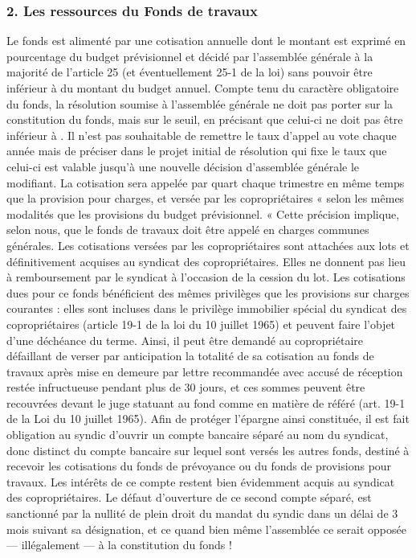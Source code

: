 		\subsubsection{2. Les ressources du Fonds de travaux}
		
			Le fonds est alimenté par une cotisation annuelle dont le montant est exprimé en pourcentage du budget prévisionnel et décidé par l’assemblée générale à la majorité de l’article 25 (et éventuellement 25-1 de la loi) sans pouvoir être inférieur à   du montant du budget annuel.
			Compte tenu du caractère obligatoire du fonds, la résolution soumise à l’assemblée générale ne doit pas porter sur la constitution du fonds, mais sur le seuil, en précisant que celui-ci ne doit pas être inférieur à . Il n’est pas souhaitable de remettre le taux d’appel au vote chaque année mais de préciser dans le projet initial de résolution qui fixe le taux que celui-ci est valable jusqu’à une nouvelle décision d’assemblée générale le modifiant.
			La cotisation sera appelée par quart chaque trimestre en même temps que la provision pour charges, et versée par les copropriétaires « selon les mêmes modalités que les provisions du budget prévisionnel. « Cette précision implique, selon nous, que le fonds de travaux doit être appelé en charges communes générales.
			Les cotisations versées par les copropriétaires sont attachées aux lots et définitivement acquises au syndicat des copropriétaires. Elles ne donnent pas lieu à remboursement par le syndicat à l’occasion de la cession du lot.
			Les cotisations dues pour ce fonds bénéficient des mêmes privilèges que les provisions sur charges courantes : elles sont incluses dans le privilège immobilier spécial du syndicat des copropriétaires (article 19-1 de la loi du 10 juillet 1965) et peuvent faire l’objet d’une déchéance du terme. Ainsi, il peut être demandé au copropriétaire défaillant de verser par anticipation la totalité de sa cotisation au fonds de travaux après mise en demeure par lettre recommandée avec accusé de réception restée infructueuse pendant plus de 30 jours, et ces sommes peuvent être recouvrées devant le juge statuant au fond comme en matière de référé (art. 19-1 de la Loi du 10 juillet 1965).
			Afin de protéger l’épargne ainsi constituée, il est fait obligation au syndic d’ouvrir un compte bancaire séparé au nom du syndicat, donc distinct du compte bancaire sur lequel sont versés les autres fonds, destiné à recevoir les cotisations du fonds de prévoyance ou du fonds de provisions pour travaux. Les intérêts de ce compte restent bien évidemment acquis au syndicat des copropriétaires.
			Le défaut d’ouverture de ce second compte séparé, est sanctionné par la nullité de plein droit du mandat du syndic dans un délai de 3 mois suivant sa désignation, et ce quand bien même l’assemblée ce serait opposée --– illégalement --- à la constitution du fonds !
		
